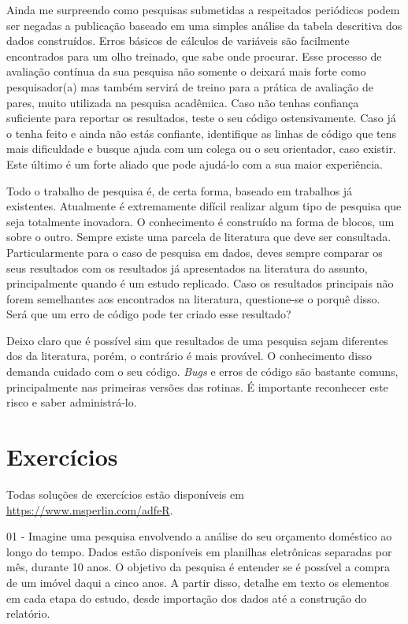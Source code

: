 \documentclass[
  11pt,
]{book}
\begin{document}
Ainda me surpreendo como pesquisas submetidas a respeitados periódicos podem ser negadas a publicação baseado em uma simples análise da tabela descritiva dos dados construídos. Erros básicos de cálculos de variáveis são facilmente encontrados para um olho treinado, que sabe onde procurar. Esse processo de avaliação contínua da sua pesquisa não somente o deixará mais forte como pesquisador(a) mas também servirá de treino para a prática de avaliação de pares, muito utilizada na pesquisa acadêmica. Caso não tenhas confiança suficiente para reportar os resultados, teste o seu código ostensivamente. Caso já o tenha feito e ainda não estás confiante, identifique as linhas de código que tens mais dificuldade e busque ajuda com um colega ou o seu orientador, caso existir. Este último é um forte aliado que pode ajudá-lo com a sua maior experiência.

Todo o trabalho de pesquisa é, de certa forma, baseado em trabalhos já existentes. Atualmente é extremamente difícil realizar algum tipo de pesquisa que seja totalmente inovadora. O conhecimento é construído na forma de blocos, um sobre o outro. Sempre existe uma parcela de literatura que deve ser consultada. Particularmente para o caso de pesquisa em dados, deves sempre comparar os seus resultados com os resultados já apresentados na literatura do assunto, principalmente quando é um estudo replicado. Caso os resultados principais não forem semelhantes aos encontrados na literatura, questione-se o porquê disso. Será que um erro de código pode ter criado esse resultado?

Deixo claro que é possível sim que resultados de uma pesquisa sejam diferentes dos da literatura, porém, o contrário é mais provável. O conhecimento disso demanda cuidado com o seu código. \emph{Bugs} e erros de código são bastante comuns, principalmente nas primeiras versões das rotinas. É importante reconhecer este risco e saber administrá-lo.

\hypertarget{exerc-scripts-pesquisa}{%
\section{Exercícios}\label{exerc-scripts-pesquisa}}

Todas soluções de exercícios estão disponíveis em \url{https://www.msperlin.com/adfeR}.

01 -
Imagine uma pesquisa envolvendo a análise do seu orçamento doméstico ao longo do tempo. Dados estão disponíveis em planilhas eletrônicas separadas por mês, durante 10 anos. O objetivo da pesquisa é entender se é possível a compra de um imóvel daqui a cinco anos. A partir disso, detalhe em texto os elementos em cada etapa do estudo, desde importação dos dados até a construção do relatório.
\end{document}
